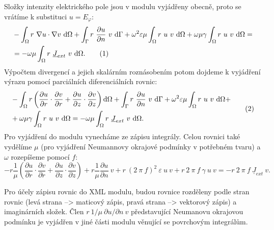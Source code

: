 \documentclass[12pt,a4paper,oneside]{article}
\numberwithin{equation}{section} %
\numberwithin{figure}{section} %
\numberwithin{table}{section} %
\newcommand{\faz}[1]{{\underline{#1}}} %
\newcommand\numberthis{\addtocounter{equation}{1}\tag{\theequation}}
\begin{document}
Složky intenzity elektrického pole jsou v modulu vyjádřeny obecně, proto se vrátíme k substituci $u = E_\varphi$:
\begin{align*}
&- \int _{\Omega} r ~ \nabla u \cdot \nabla v ~ \ud \Omega + \int _{\Gamma} r ~ \frac{\partial u}{\partial n} ~ v ~ \ud \Gamma + \omega ^2 \varepsilon \mu \int _{\Omega} r ~ u ~ v ~ \ud \Omega + \omega \mu \gamma \int _{\Omega} r ~ u ~ v ~ \ud \Omega =\\
&= - \omega \mu \int _{\Omega} r ~ \faz{J} _{ext} ~ v ~ \ud \Omega .
\numberthis
\end{align*}
Výpočtem divergencí a jejich skalárním roznásobením potom dojdeme k vyjádření výrazu pomocí parciálních diferenciálních rovnic:
\begin{equation*}
\begin{split}
&- \int _{\Omega} r \left( \frac{\partial u}{\partial r} \cdot \frac{\partial v}{\partial r} + \frac{\partial u}{\partial z} \cdot \frac{\partial v}{\partial z} \right) \ud \Omega + \int _{\Gamma} r ~ \frac{\partial u}{\partial n} ~ v ~ \ud \Gamma + \omega ^2 \varepsilon \mu \int _{\Omega} r ~ u ~ v ~ \ud \Omega +\\
& + \omega \mu \gamma \int _{\Omega} r ~ u ~ v ~ \ud \Omega = - \omega \mu \int _{\Omega} r ~ \faz{J} _{ext} ~ v ~ \ud \Omega .
\end{split}
\numberthis
\end{equation*}
Pro vyjádření do modulu vynecháme ze zápisu integrály. Celou rovnici také vydělíme $\mu$ (pro vyjádření Neumannovy okrajové podmínky v potřebném tvaru) a $\omega$ rozepíšeme pomocí $f$:
\begin{equation}
\label{EphiWeakEpsilon}
- r \frac{1}{\mu} \left( \frac{\partial u}{\partial r} \cdot \frac{\partial v}{\partial r} + \frac{\partial u}{\partial z} \cdot \frac{\partial v}{\partial z} \right) + r \frac{1}{\mu} \frac{\partial u}{\partial n} ~ v + r ~ (2 ~ \pi ~ f) ^2 ~ \varepsilon ~ u ~ v + r ~ 2 ~ \pi ~ f ~ \gamma ~ u ~ v = - r ~ 2 ~ \pi ~ f ~ \faz{J} _{ext} ~ v .
\end{equation}

Pro účely zápisu rovnic do XML modulu, budou rovnice rozděleny podle stran rovnic (levá strana --> maticový zápis, pravá strana --> vektorový zápis) a imaginárních složek. Člen $r ~ 1/ \mu ~ \partial u / \partial n ~ v$ představující Neumanovu okrajovou podmínku je vyjádřen v jiné části modulu věnující se povrchovým integrálům.
\end{document}
